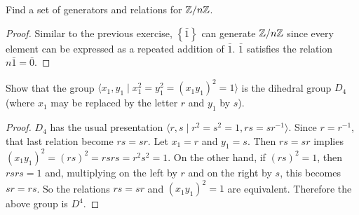  Find a set of generators and relations for $\mathbb{Z}/n\mathbb{Z}$.
\begin{proof}
  Similar to the previous exercise, $\left\{\bar1\right\}$ can
  generate $\mathbb{Z}/n\mathbb{Z}$ since every element can be expressed as a repeated
  addition of $\bar1$. $\bar1$ satisfies the relation
  $n\bar1 = \bar0$.
\end{proof}

 Show that the group
$\langle x_1,y_1\mid x_1^2 = y_1^2 = (x_1y_1)^2 = 1\rangle$ is the
dihedral group $D_4$ (where $x_1$ may be replaced by the letter $r$
and $y_1$ by $s$).
\begin{proof}
  $D_4$ has the usual presentation
  $\langle r,s\mid r^2 = s^2 = 1, rs = sr^{-1}\rangle$. Since
  $r = r^{-1}$, that last relation become $rs = sr$. Let $x_1 = r$ and
  $y_1 = s$. Then $rs = sr$ implies
  $(x_1y_1)^2 = (rs)^2 = rsrs = r^2s^2 = 1$. On the other hand, if
  $(rs)^2 = 1$, then $rsrs = 1$ and, multiplying on the left by $r$
  and on the right by $s$, this becomes $sr = rs$. So the relations
  $rs = sr$ and $(x_1y_1)^2 = 1$ are equivalent. Therefore the above
  group is $D^4$.
\end{proof}

